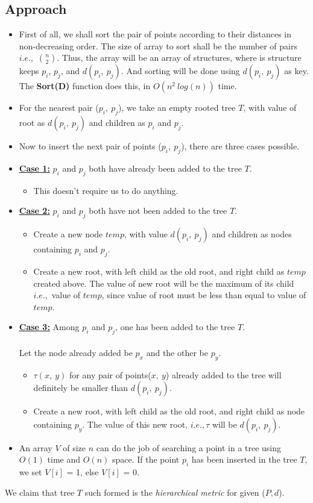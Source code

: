 \documentclass[pdftex,a4paper,12pt]{report}
\begin{document}
	\subsection{Approach}
	\begin{itemize}
		\item
		First of all, we shall sort the pair of points according to their distances in non-decreasing order. The size of array to sort shall
		be the number of pairs $i.e.,$ $n \choose 2$. Thus, the array will be an array of structures, where is structure keeps $p_i$, $p_j$, and 
		$d(p_i,\ p_j)$. And sorting will be done using $d(p_i,\ p_j)$ as key. The \textbf{Sort(D)} function does this, in $O(n^2\ log(n))$ time.
		\item
		For the nearest pair ($p_i,\ p_j$), we take an empty rooted tree $T$, with value of root as $d(p_i,\ p_j)$ and children as $p_i$ and $p_j$. 
		\item
		Now to insert the next pair of points ($p_i,\ p_j$), there are three cases possible.
			\item \textbf{\underline{Case 1:}}
			$p_i$ and $p_j$ both have already been added to the tree $T$.
				\begin{itemize}
					\item This doesn't require us to do anything.
				\end{itemize}
			\item \textbf{\underline{Case 2:}}
			$p_i$ and $p_j$ both have not been added to the tree $T$.
				\begin{itemize}
					\item Create a new node \textbf{$temp$}, with value $d(p_i,\ p_j)$ and children as nodes containing $p_i$ and $p_j$.
					\item Create a new root, with left child as the old root, and right child as $temp$ created above. The value of new root will 
					be the maximum of its child $i.e.,$ value of $temp$, since value of root must be less than equal to value of $temp$.
				\end{itemize}
			\item \textbf{\underline{Case 3:}}
			Among $p_i$ and $p_j$, one has been added to the tree $T$.
			\\\\Let the node already added be $p_x$ and the other be $p_y$.
				\begin{itemize}
					\item $\tau(x,\ y)$ for any pair of points($x,\ y$) already added to the tree will definitely be smaller than $d(p_i,\ p_j)$.
					\item Create a new root, with left child as the old root, and right child as node containing $p_y$. The value of this new
					root, $i.e., \tau$ will be $d(p_i,\ p_j)$.
				\end{itemize}
			\item An array $V$ of size $n$ can do the job of searching a point in a tree using $O(1)$ time and $O(n)$ space. If the point $p_i$ has been 
			inserted in the tree $T$, we set $V[i]$ = 1, else $V[i]$ = 0.
	\end{itemize}
	We claim that tree $T$ such formed is the \emph{hierarchical metric} for given ($P, d$).
\end{document}
